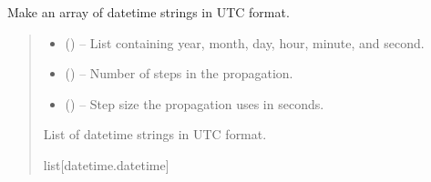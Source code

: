 \documentclass[letterpaper,10pt,english]{sphinxmanual}
\begin{document}
\begin{fulllineitems}
\label{\detokenize{fspsim.utils:fspsim.utils.Conversions.UTC_step}}
\pysigstartsignatures
{}
\pysigstopsignatures
\sphinxAtStartPar
Make an array of datetime strings in UTC format.
\begin{quote}\begin{description}
\begin{itemize}
\item {} 
\sphinxAtStartPar
{} (\sphinxstyleliteralemphasis{\sphinxupquote{{[}}}\sphinxstyleliteralemphasis{\sphinxupquote{{]}}}) – List containing year, month, day, hour, minute, and second.

\item {} 
\sphinxAtStartPar
{} () – Number of steps in the propagation.

\item {} 
\sphinxAtStartPar
{} () – Step size the propagation uses in seconds.

\end{itemize}

\sphinxAtStartPar
List of datetime strings in UTC format.

\sphinxAtStartPar
list{[}datetime.datetime{]}

\end{description}\end{quote}

\end{fulllineitems}

\end{document}
